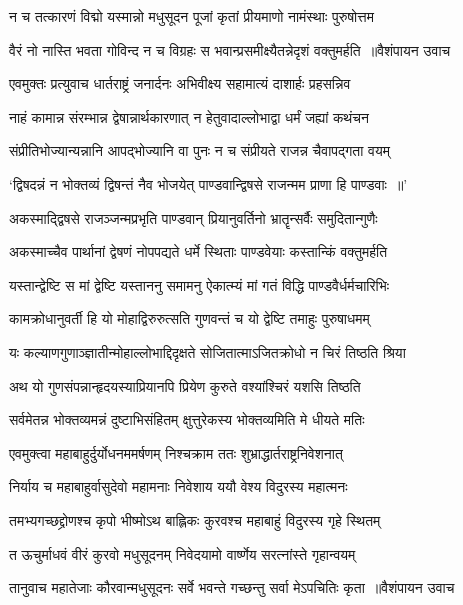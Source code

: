 \twolineshloka
{न च तत्कारणं विद्मो यस्मान्नो मधुसूदन}
{पूजां कृतां प्रीयमाणो नामंस्थाः पुरुषोत्तम}


\threelineshloka
{वैरं नो नास्ति भवता गोविन्द न च विग्रहः}
{स भवान्प्रसमीक्ष्यैतन्नेदृशं वक्तुमर्हति ॥वैशंपायन उवाच}
{}


\twolineshloka
{एवमुक्तः प्रत्युवाच धार्तराष्ट्रं जनार्दनः}
{अभिवीक्ष्य सहामात्यं दाशार्हः प्रहसन्निव}


\twolineshloka
{नाहं कामान्न संरम्भान्न द्वेषान्नार्थकारणात्}
{न हेतुवादाल्लोभाद्वा धर्मं जह्यां कथंचन}


\twolineshloka
{संप्रीतिभोज्यान्यन्नानि आपद्भोज्यानि वा पुनः}
{न च संप्रीयते राजन्न चैवापद्गता वयम्}


\twolineshloka
{`द्विषदन्नं न भोक्तव्यं द्विषन्तं नैव भोजयेत्}
{पाण्डवान्द्विषसे राजन्मम प्राणा हि पाण्डवाः ॥'}


\twolineshloka
{अकस्माद्द्विषसे राजञ्जन्मप्रभृति पाण्डवान्}
{प्रियानुवर्तिनो भ्रातॄन्सर्वैः समुदितान्गुणैः}


\twolineshloka
{अकस्माच्चैव पार्थानां द्वेषणं नोपपद्यते}
{धर्मे स्थिताः पाण्डवेयाः कस्तान्किं वक्तुमर्हति}


\twolineshloka
{यस्तान्द्वेष्टि स मां द्वेष्टि यस्ताननु समामनु}
{ऐकात्म्यं मां गतं विद्धि पाण्डवैर्धर्मचारिभिः}


\twolineshloka
{कामक्रोधानुवर्ती हि यो मोहाद्विरुरुत्सति}
{गुणवन्तं च यो द्वेष्टि तमाहुः पुरुषाधमम्}


\twolineshloka
{यः कल्याणगुणाञ्ज्ञातीन्मोहाल्लोभाद्दिदृक्षते}
{सोजितात्माऽजितक्रोधो न चिरं तिष्ठति श्रिया}


\twolineshloka
{अथ यो गुणसंपन्नान्हृदयस्याप्रियानपि}
{प्रियेण कुरुते वश्यांश्चिरं यशसि तिष्ठति}


\twolineshloka
{सर्वमेतन्न भोक्तव्यमन्नं दुष्टाभिसंहितम्}
{क्षुत्तुरेकस्य भोक्तव्यमिति मे धीयते मतिः}


\twolineshloka
{एवमुक्त्वा महाबाहुर्दुर्योधनममर्षणम्}
{निश्चक्राम ततः शुभ्राद्धार्तराष्ट्रनिवेशनात्}


\twolineshloka
{निर्याय च महाबाहुर्वासुदेवो महामनाः}
{निवेशाय ययौ वेश्य विदुरस्य महात्मनः}


\twolineshloka
{तमभ्यगच्छद्द्रोणश्च कृपो भीष्मोऽथ बाह्लिकः}
{कुरवश्च महाबाहुं विदुरस्य गृहे स्थितम्}


\twolineshloka
{त ऊचुर्माधवं वीरं कुरवो मधुसूदनम्}
{निवेदयामो वार्ष्णेय सरत्नांस्ते गृहान्वयम्}


\threelineshloka
{तानुवाच महातेजाः कौरवान्मधुसूदनः}
{सर्वे भवन्ते गच्छन्तु सर्वा मेऽपचितिः कृता ॥वैशंपायन उवाच}
{}


